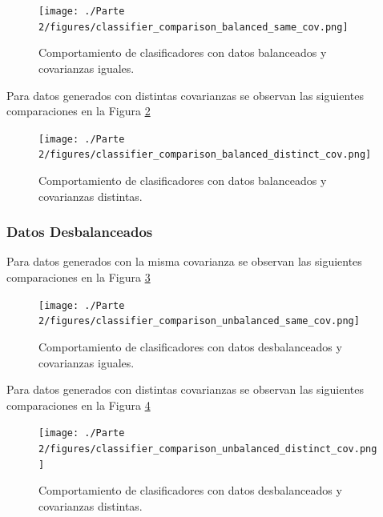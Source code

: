\documentclass[10pt]{article}
\begin{document}
\begin{figure}[!ht]
    \centering
    \texttt{[image: ./Parte 2/figures/classifier\_comparison\_balanced\_same\_cov.png]}
    \caption{Comportamiento de clasificadores con datos balanceados y covarianzas iguales.}    
    \label{fig:classifier-comparison-balanced-same-cov}
\end{figure}

\newpage

Para datos generados con distintas covarianzas se observan las siguientes
comparaciones en la Figura \ref{fig:classifier-comparison-balanced-distinct-cov}

\begin{figure}[!ht]
    \centering
    \texttt{[image: ./Parte 2/figures/classifier\_comparison\_balanced\_distinct\_cov.png]}
    \caption{Comportamiento de clasificadores con datos balanceados y covarianzas distintas.}    
    \label{fig:classifier-comparison-balanced-distinct-cov}
\end{figure}

\newpage

\subsubsection*{Datos Desbalanceados}

Para datos generados con la misma covarianza se observan las siguientes
comparaciones en la Figura \ref{fig:classifier-comparison-unbalanced-same-cov}

\begin{figure}[!ht]
    \centering
    \texttt{[image: ./Parte 2/figures/classifier\_comparison\_unbalanced\_same\_cov.png]}
    \caption{Comportamiento de clasificadores con datos desbalanceados y covarianzas iguales.}    
    \label{fig:classifier-comparison-unbalanced-same-cov}
\end{figure}

\newpage

Para datos generados con distintas covarianzas se observan las siguientes
comparaciones en la Figura \ref{fig:classifier-comparison-unbalanced-distinct-cov}

\begin{figure}[!ht]
    \centering
    \texttt{[image: ./Parte 2/figures/classifier\_comparison\_unbalanced\_distinct\_cov.png]}
    \caption{Comportamiento de clasificadores con datos desbalanceados y covarianzas distintas.}    
    \label{fig:classifier-comparison-unbalanced-distinct-cov}
\end{figure}
\end{document}
